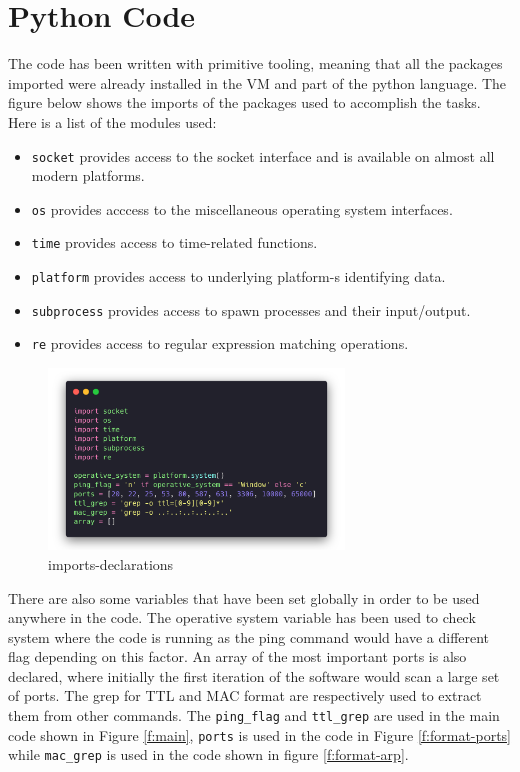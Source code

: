 \section{Python Code}
\label{s:lab2-python-code}
The code has been written with primitive tooling, meaning that all the packages
imported were already installed in the VM and part of the python language. The
figure below shows the imports of the packages used to accomplish the tasks.
Here is a list of the modules used:
\begin{itemize}
  \item \lstinline{socket} provides access to the socket interface and is available on almost all modern platforms.
  \item \lstinline{os} provides acccess to the miscellaneous operating system interfaces.
  \item \lstinline{time} provides access to time-related functions.
  \item \lstinline{platform} provides access to underlying platform-s identifying data.
  \item \lstinline{subprocess} provides access to spawn processes and their input/output.
  \item \lstinline{re} provides access to regular expression matching operations.
\end{itemize}
\begin{figure}[H]
  \centering
  \includegraphics[width=0.7\textwidth]{figures/code/imports}
  \caption{imports-declarations}
  \label{f:imports-declarations}
\end{figure}

There are also some variables that have been set globally in order to be used
anywhere in the code. The operative system variable has been used to check
system where the code is running as the ping command would have a different flag
depending on this factor. An array of the most important ports is also declared,
where initially the first iteration of the software would scan a large set of
ports. The grep for TTL and MAC format are respectively used to extract them
from other commands. The \lstinline{ping_flag} and \lstinline{ttl_grep} are used in the main code
shown in Figure \ref{f:main}, \lstinline{ports} is used in the code in Figure
\ref{f:format-ports} while \lstinline{mac_grep} is used in the code shown in
figure \ref{f:format-arp}.

